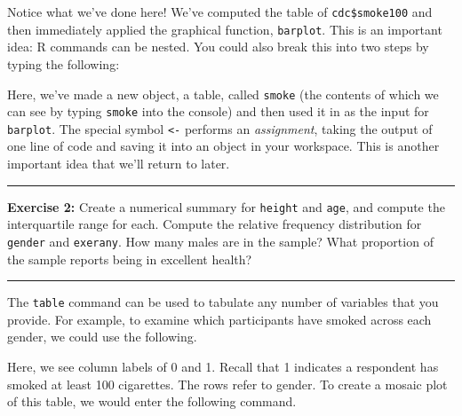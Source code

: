 \documentclass[]{book}
\newenvironment{Shaded}{\begin{snugshade}}{\end{snugshade}}
\newcommand{\KeywordTok}[1]{\textcolor[rgb]{0.13,0.29,0.53}{\textbf{#1}}}
\newcommand{\StringTok}[1]{\textcolor[rgb]{0.31,0.60,0.02}{#1}}
\newcommand{\OperatorTok}[1]{\textcolor[rgb]{0.81,0.36,0.00}{\textbf{#1}}}
\newcommand{\NormalTok}[1]{#1}
\theoremstyle{definition}
\theoremstyle{definition}
\theoremstyle{definition}
\theoremstyle{remark}
\begin{document}
Notice what we've done here! We've computed the table of
\texttt{cdc\$smoke100} and then immediately applied the graphical
function, \texttt{barplot}. This is an important idea: R commands can be
nested. You could also break this into two steps by typing the
following:

\begin{Shaded}
\end{Shaded}

Here, we've made a new object, a table, called \texttt{smoke} (the
contents of which we can see by typing \texttt{smoke} into the console)
and then used it in as the input for \texttt{barplot}. The special
symbol \texttt{\textless{}-} performs an \emph{assignment}, taking the
output of one line of code and saving it into an object in your
workspace. This is another important idea that we'll return to later.

\begin{center}\rule{0.5\linewidth}{\linethickness}\end{center}

\textbf{Exercise 2:} Create a numerical summary for \texttt{height} and
\texttt{age}, and compute the interquartile range for each. Compute the
relative frequency distribution for \texttt{gender} and
\texttt{exerany}. How many males are in the sample? What proportion of
the sample reports being in excellent health?

\begin{center}\rule{0.5\linewidth}{\linethickness}\end{center}

The \texttt{table} command can be used to tabulate any number of
variables that you provide. For example, to examine which participants
have smoked across each gender, we could use the following.

\begin{Shaded}
\end{Shaded}

Here, we see column labels of 0 and 1. Recall that 1 indicates a
respondent has smoked at least 100 cigarettes. The rows refer to gender.
To create a mosaic plot of this table, we would enter the following
command.
\end{document}

